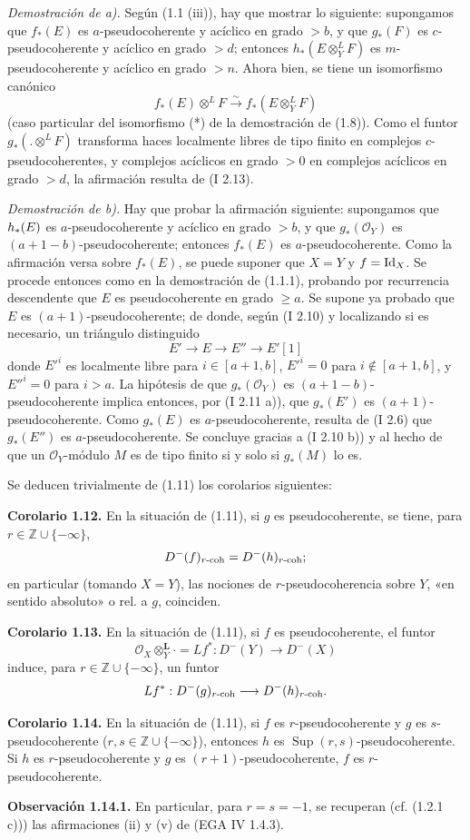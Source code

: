 \emph{Demostración de a).} Según (1.1 (iii)), hay que mostrar lo siguiente: supongamos que \(f_*(E)\) es \(a\)-pseudocoherente y acíclico en grado \(>b\), y que \(g_*(F)\) es \(c\)-pseudocoherente y acíclico en grado \(>d\); entonces \(h_*(E\otimes_Y^{L}F)\) es \(m\)-pseudocoherente y acíclico en grado \(>n\). Ahora bien, se tiene un isomorfismo canónico
\[
 f_*(E)\otimes^{L}F\xrightarrow{\sim} f_*(E\otimes_Y^{L}F)
\]
(caso particular del isomorfismo (*) de la demostración de (1.8)). Como el funtor \(g_*(.\otimes^{L}F)\) transforma haces localmente libres de tipo finito en complejos \(c\)-pseudocoherentes, y complejos acíclicos en grado \(>0\) en complejos acíclicos en grado \(>d\), la afirmación resulta de (I 2.13).

\emph{Demostración de b).} Hay que probar la afirmación siguiente: supongamos que \(\sisi{f_*(E)}{h_*(E)}\) es \(a\)-pseudocoherente y acíclico en grado \(>b\), y que \(g_*(\mathcal O_Y)\) es \((a+1-b)\)-pseudocoherente; entonces \(f_*(E)\) es \(a\)-pseudocoherente. Como la afirmación versa sobre \(f_*(E)\), se puede suponer que \(X=Y\) y \(f=\Id_X\). Se procede entonces como en la demostración de (1.1.1), probando por recurrencia descendente que \(E\) es pseudocoherente en grado \(\ge a\). Se supone ya probado que \(E\) es \((a+1)\)-pseudocoherente; de donde, según (I 2.10) y localizando si es necesario, un triángulo distinguido
\[
E'\longrightarrow E\longrightarrow E''\longrightarrow E'[1]
\]
donde \(E'^i\) es localmente libre para \(i\in[a+1,b]\), \(E'^i=0\) para \(i\notin[a+1,b]\), y \(E''^i=0\) para \(i>a\). La hipótesis de que \(g_*(\mathcal O_Y)\) es \((a+1-b)\)-pseudocoherente implica entonces, por (I 2.11 a)), que \(g_*(E')\) es \((a+1)\)-pseudocoherente. Como \(g_*(E)\) es \(a\)-pseudocoherente, resulta de (I 2.6) que \(g_*(E'')\) es \(a\)-pseudocoherente. Se concluye gracias a (I 2.10 b)) y al hecho de que un \(\mathcal O_Y\)-módulo \(M\) es de tipo finito si y solo si \(g_*(M)\) lo es.

Se deducen trivialmente de (1.11) los corolarios siguientes:

\textbf{Corolario 1.12.} En la situación de (1.11), si \(g\) es pseudocoherente, se tiene, para \(r\in\mathbb Z\cup\{-\infty\}\),
\[
 D^{-}(f)_{r\text{-}\coh}=D^{-}(h)_{r\text{-}\coh};
\]
en particular (tomando \(X=Y\)), las nociones de \(r\)-pseudocoherencia sobre \(Y\), «en sentido absoluto» o rel. a \(g\), coinciden.

\textbf{Corolario 1.13.} En la situación de (1.11), si \(f\) es pseudocoherente, el funtor
\[
 \mathcal O_X\otimes_Y^{\mathbf L}\cdot=Lf^*:D^{-}(Y)\longrightarrow D^{-}(X)
\]
induce, para \(r\in\mathbb Z\cup\{-\infty\}\), un funtor
\[
 Lf^*:D^{-}(g)_{r\text{-}\coh}\longrightarrow D^{-}(h)_{r\text{-}\coh}.
\]

\textbf{Corolario 1.14.} En la situación de (1.11), si \(f\) es \(r\)-pseudocoherente y \(g\) es \(s\)-pseudocoherente (\(r,s\in\mathbb Z\cup\{-\infty\}\)), entonces \(h\) es \(\operatorname{Sup}(r,s)\)-pseudocoherente. Si \(h\) es \(r\)-pseudocoherente y \(g\) es \((r+1)\)-pseudocoherente, \(f\) es \(r\)-pseudocoherente.

\textbf{Observación 1.14.1.} En particular, para \(r=s=-1\), se recuperan (cf. (1.2.1 c))) las afirmaciones (ii) y (v) de (EGA IV 1.4.3).
